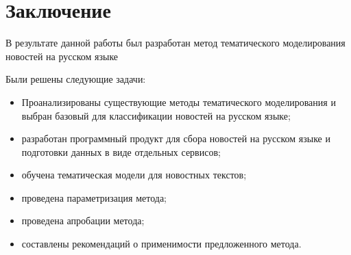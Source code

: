 \chapter{Заключение}

В результате данной работы был разработан метод тематического моделирования новостей на русском языке

Были решены следующие задачи:



\begin{itemize}
    \item Проанализированы существующие методы тематического моделирования и выбран базовый для классификации новостей на русском языке;
    \item разработан программный продукт для сбора новостей на русском языке и подготовки данных в виде отдельных сервисов;
    \item обучена тематическая модели для новостных текстов;
    \item проведена параметризация метода;
    \item проведена апробации метода;
    \item составлены рекомендаций о применимости предложенного метода.
\end{itemize}


